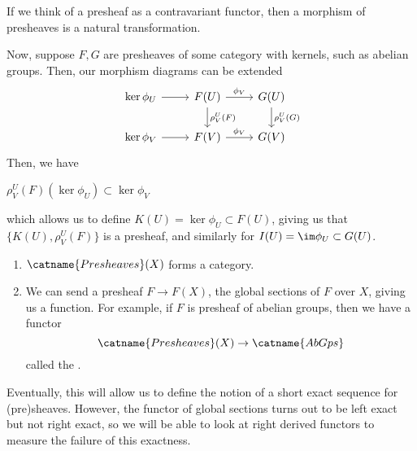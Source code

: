 \documentclass[11pt,leqno,oneside]{amsbook}
\renewcommand{\F}{F} %
\newcommand{\G}{G}
\numberwithin{thm}{section}
\begin{document}
\begin{rmk}
  If we think of a presheaf as a contravariant functor, then a
  morphism of presheaves is a natural transformation.
\end{rmk}
Now, suppose \(F,G\) are presheaves of some category with kernels,
such as abelian groups. Then, our morphism diagrams can be extended \[
    \begin{tikzcd}
      \ker \phi_U \ar[r] & \F(U) \ar[d,"\rho^U_V(\F)"] \ar[r,"\phi_V"]
      & \G(U) 
      \ar[d,"\rho^U_V(\G)"] \\
      \ker \phi_V \ar[r] & \F(V) \ar[r, "\phi_V"] & \G(V)
    \end{tikzcd}
  \]
Then, we have
\begin{prop}
  \(\rho^U_V(F)(\ker \phi_U) \subset \ker \phi_V\)
\end{prop}
which allows us to define \(K(U) = \ker \phi_U \subset \F(U)\), giving
us that \(\{K(U), \rho^U_V(\F)\}\) is a presheaf, and similarly for
\(I(U) = \im \phi_U \subset \G(U)\).
\begin{prop}
  \begin{enumerate}
  \item \(\catname{Presheaves}(X)\) forms a category.
  \item We can send a presheaf \(\F \to \F(X)\), the global sections
    of \(\F\) over \(X\), giving us a function. For example, if \(\F\)
    is presheaf of abelian groups, then we have a functor \[
      \catname{Presheaves}(X) \to \catname{AbGps}
    \]
    called the .
  \end{enumerate}
\end{prop}
Eventually, this will allow us to define the notion of a short exact
sequence for (pre)sheaves. However, the functor of global sections
turns out to be left exact but not right exact, so we will be able to
look at right derived functors to measure the failure of this
exactness.
\end{document}
